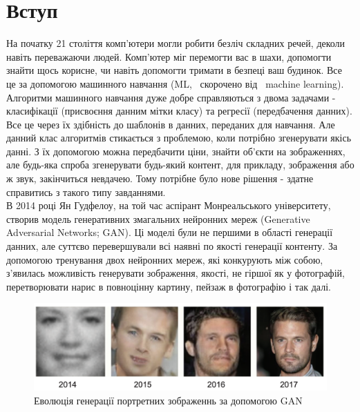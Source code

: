\documentclass{article}
\begin{document}
	\section{Вступ}
	\quad На початку 21 століття комп'ютери могли робити безліч складних речей, деколи навіть переважаючи людей. Комп'ютер міг перемогти вас в шахи, допомогти знайти щось корисне, чи навіть допомогти тримати в безпеці ваш будинок. Все це за допомогою машинного навчання (ML,  скорочено від  machine learning). Алгоритми машинного навчання дуже добре справляються з двома задачами - класифікації (присвоєння данним мітки класу) та регресії (передбачення данних). Все це через їх здібність до  шаблонів в данних, переданих для навчання. Але данний клас алгоритмів стикається з проблемою, коли потрібно згенерувати якісь данні. З їх допомогою можна передбачити ціни, знайти об'єкти на зображеннях, але будь-яка спроба згенерувати будь-який контент, для прикладу, зображення або ж звук, закінчиться невдачею. Тому потрібне було нове рішення - здатне справитись з такого типу завданнями. \\
	\null\quad В 2014 році Ян Гудфелоу, на той час аспірант Монреальського університету, створив модель генеративних змагальних нейронних мереж (Generative Adversarial Networks; GAN). Ці моделі були не першими в області генерації данних, але суттєво перевершували всі наявні по якості генерації контенту. За допомогою тренування двох нейронних мереж, які конкурують між собою, з'явилась можливість генерувати зображення, якості, не гіршої як у фотографій, перетворювати нарис в повноцінну картину, пейзаж в фотографію і так далі. \\
	
	\begin{figure}[H]
		\centering
		\includegraphics[scale=0.6]{faces.png}
		\caption{Еволюція генерації портретних зображеннь за допомогою GAN}
	\end{figure} 
\end{document}
